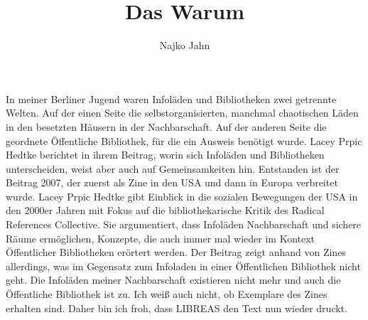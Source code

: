 \documentclass[output=paper,toc=false]{langsci/langscibook}
\title{Das Warum}
\author{Najko Jahn}
\begin{document}
\maketitle


\noindent  In meiner Berliner Jugend waren Infoläden und Bibliotheken zwei getrennte Welten. Auf der einen Seite die selbstorganisierten, manchmal chaotischen Läden in den besetzten Häusern in der Nachbarschaft. Auf der anderen Seite die geordnete Öffentliche Bibliothek, für die ein Ausweis benötigt wurde. Lacey Prpic Hedtke berichtet in ihrem Beitrag, worin sich Infoläden und Bibliotheken unterscheiden, weist aber auch auf Gemeinsamkeiten hin. Entstanden ist der Beitrag 2007, der zuerst als Zine in den USA und dann in Europa verbreitet wurde. Lacey Prpic Hedtke gibt Einblick in die sozialen Bewegungen der USA in den 2000er Jahren mit Fokus auf die bibliothekarische Kritik des Radical References Collective. Sie argumentiert, dass Infoläden  Nachbarschaft und sichere Räume ermöglichen, Konzepte, die auch immer mal wieder im Kontext Öffentlicher Bibliotheken erörtert werden. Der Beitrag zeigt anhand von Zines allerdings, was im Gegensatz zum Infoladen in einer Öffentlichen Bibliothek nicht geht. Die Infoläden meiner Nachbarschaft existieren nicht mehr und auch die Öffentliche Bibliothek ist zu. Ich weiß auch nicht, ob Exemplare des Zines erhalten sind. Daher bin ich froh, dass LIBREAS den Text nun wieder druckt.
\end{document}
